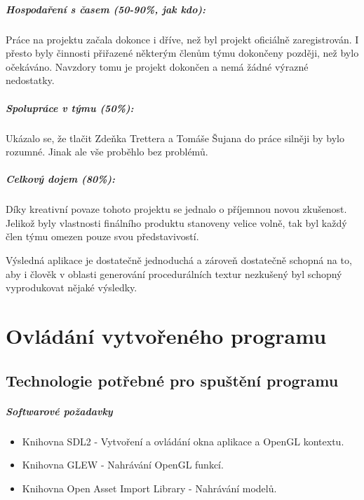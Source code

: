 \documentclass[12pt,a4paper,titlepage,final]{report}
\begin{document}
\paragraph{Hospodaření s časem (50-90\%, jak kdo):} Práce na projektu začala dokonce i dříve, než byl projekt oficiálně zaregistrován. I přesto byly činnosti přiřazené některým členům týmu dokončeny později, než bylo očekáváno. Navzdory tomu je projekt dokončen a nemá žádné výrazné nedostatky.

\paragraph{Spolupráce v týmu (50\%):} Ukázalo se, že tlačit Zdeňka Trettera a Tomáše Šujana do práce silněji by bylo rozumné. Jinak ale vše proběhlo bez problémů.

\paragraph{Celkový dojem (80\%):} Díky kreativní povaze tohoto projektu se jednalo o příjemnou novou zkušenost. Jelikož byly vlastnosti finálního produktu stanoveny velice volně, tak byl každý člen týmu omezen pouze svou představivostí. 

Výsledná aplikace je dostatečně jednoduchá a zároveň dostatečně schopná na to, aby i člověk v oblasti generování procedurálních textur nezkušený byl schopný vyprodukovat nějaké výsledky.

\chapter{Ovládání vytvořeného programu}

\section{Technologie potřebné pro spuštění programu}
\paragraph{Softwarové požadavky}
\begin{itemize}
	\item Knihovna SDL2 - Vytvoření a ovládání okna aplikace a OpenGL kontextu.
	\item Knihovna GLEW - Nahrávání OpenGL funkcí.
	\item Knihovna Open Asset Import Library - Nahrávání modelů.
\end{itemize}
\end{document}
